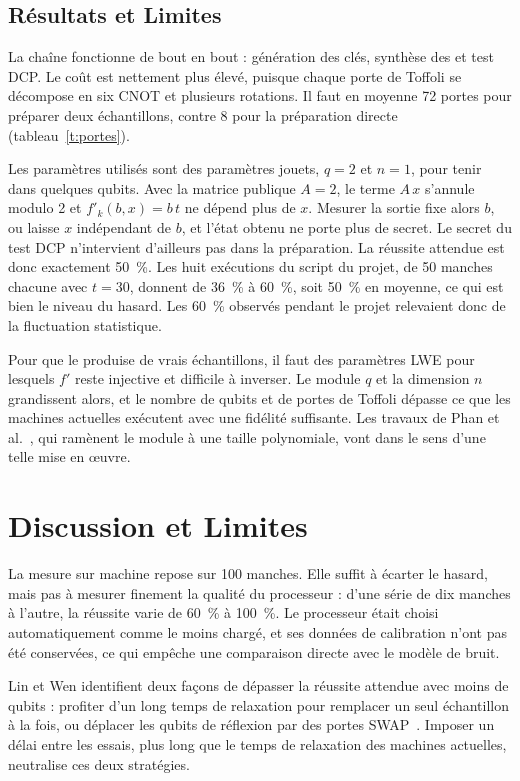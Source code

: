 \subsection{Résultats et Limites}
La chaîne fonctionne de bout en bout : génération des
clés, synthèse des  et test DCP. Le coût est
nettement plus élevé, puisque chaque porte de Toffoli se
décompose en six CNOT et plusieurs rotations. Il faut
en moyenne 72 portes pour préparer deux échantillons,
contre 8 pour la préparation directe (tableau~\ref{t:portes}).

Les paramètres utilisés sont des paramètres jouets,
$q = 2$ et $n = 1$, pour tenir dans quelques qubits. Avec la
matrice publique $A = 2$, le terme $A\,x$ s'annule modulo 2
et $f'_k(b,x) = b\,t$ ne dépend plus de $x$. Mesurer la sortie
fixe alors $b$, ou laisse $x$ indépendant de $b$, et l'état obtenu
ne porte plus de secret. Le secret du test DCP n'intervient
d'ailleurs pas dans la préparation. La réussite attendue
est donc exactement 50~\%. Les huit exécutions du script
du projet, de 50 manches chacune avec $t = 30$, donnent
de 36~\% à 60~\%, soit 50~\% en moyenne, ce qui est bien le
niveau du hasard. Les 60~\% observés pendant le projet
relevaient donc de la fluctuation statistique.

Pour que le  produise de vrais échantillons, il faut des paramètres LWE pour lesquels $f'$ reste
injective et difficile à inverser. Le module $q$ et la dimension
$n$ grandissent alors, et le nombre de qubits et de portes
de Toffoli dépasse ce que les machines actuelles exécutent
avec une fidélité suffisante. Les travaux de Phan et al.~\cite{phan},
qui ramènent le module à une taille polynomiale, vont
dans le sens d'une telle mise en œuvre.

\section{Discussion et Limites}\label{s:disc}
 La mesure sur machine
repose sur 100 manches. Elle suffit à écarter le hasard,
mais pas à mesurer finement la qualité du processeur :
d'une série de dix manches à l'autre, la réussite varie de
60~\% à 100~\%. Le processeur était choisi automatiquement
comme le moins chargé, et ses données de calibration
n'ont pas été conservées, ce qui empêche une comparaison
directe avec le modèle de bruit.

 Lin et Wen identifient deux façons de dépasser la réussite attendue avec moins de qubits : profiter
d'un long temps de relaxation pour remplacer un seul
échantillon à la fois, ou déplacer les qubits de réflexion
par des portes SWAP~\cite{linwen}. Imposer un délai entre les essais, plus long que le temps de relaxation des machines
actuelles, neutralise ces deux stratégies.


